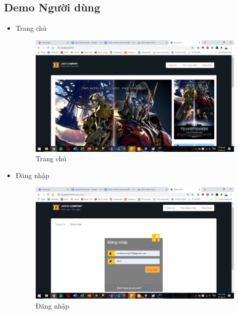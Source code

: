 \documentclass[a4paper, 12pt]{article}
\begin{document}
\subsection{Demo Người dùng}
\begin{itemize}
	\item Trang chủ
	\begin{figure}[H]
		\begin{center}
			\includegraphics[scale=0.5]{./image/demo_homepage.png}
			\caption{Trang chủ}
		\end{center}
	\end{figure}
\clearpage
	\item Đăng nhập
	\begin{figure}[H]
		\begin{center}
			\includegraphics[scale=0.5]{./image/demo_userlogin.png}
			\caption{Đăng nhập}
		\end{center}
	\end{figure}


\end{itemize}
\end{document}
